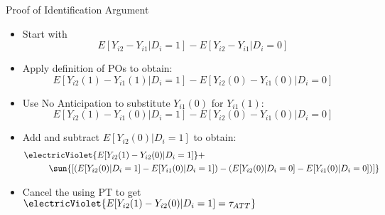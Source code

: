 \documentclass[aspectratio = 169, 12pt]{beamer}
\begin{document}
\begin{frame}{Proof of Identification Argument}
	\begin{itemize}
		\item
		Start with
		\vspace{-3mm}
		$$E[Y_{i2}- Y_{i1}| D_i =1] - E[Y_{i2} - Y_{i1}| D_i =0]$$
		
		\pause
		\vspace{-3mm}
		\item
		Apply definition of POs to obtain:
		\vspace{-3mm}
		$$E[Y_{i2}(1) - Y_{i1}(1)| D_i =1] - E[Y_{i2}(0) - Y_{i1}(0)| D_i =0]$$
		
		\pause
		\vspace{-3mm}
		\item
		Use No Anticipation to substitute $Y_{i1}(0)$ for $Y_{i1}(1)$:
		\vspace{-3mm}
		$$E[Y_{i2}(1) - Y_{i1}(0)| D_i =1] - E[Y_{i2}(0) - Y_{i1}(0)| D_i =0]$$
		
		\pause
		\vspace{-3mm}
		\item
		Add and subtract $E[ Y_{i2}(0) | D_i =1] $ to obtain:
		\vspace{-3mm}
		\begin{align*}
			& \electricViolet{E[ Y_{i2}(1) - Y_{i2}(0) | D_i =1]} + \\
			& \hspace{1cm} \sun{\left[ (E[Y_{i2}(0) | D_i = 1] - E[Y_{i1}(0)| D_i =1]) - (E[Y_{i2}(0) | D_i = 0] - E[Y_{i1}(0)| D_i =0]) \right]}
		\end{align*}
		
		\pause
		\vspace{-3mm}
		\item
		Cancel the  using PT to get $\electricViolet{E[Y_{i2}(1) - Y_{i2}(0) | D_i = 1] = \tau_{ATT}}$
	\end{itemize}
	
\end{frame}
\end{document}
